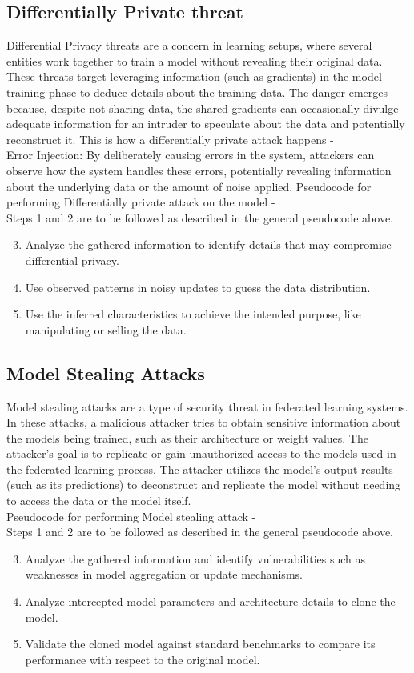 \documentclass[conference]{IEEEtran}
\begin{document}
\subsection{Differentially Private threat}
Differential Privacy threats are a concern in learning setups, where several entities work together to train a model without revealing their original data. These threats target leveraging information (such as gradients) in the model training phase to deduce details about the training data. The danger emerges because, despite not sharing data, the shared gradients can occasionally divulge adequate information for an intruder to speculate about the data and potentially reconstruct it. This is how a differentially private attack happens - \\
Error Injection: By deliberately causing errors in the system, attackers can observe how the system handles these errors, potentially revealing information about the underlying data or the amount of noise applied.
Pseudocode for performing Differentially private attack on the model - \\
Steps 1 and 2 are to be followed as described in the general pseudocode above.
\begin{enumerate}
  \setcounter{enumi}{2}
\item Analyze the gathered information to identify details that may compromise differential privacy.
\item Use observed patterns in noisy updates to guess the data distribution.
\item Use the inferred characteristics to achieve the intended purpose, like manipulating or selling the data.

\end{enumerate} 


\subsection{Model Stealing Attacks}
Model stealing attacks are a type of security threat in federated learning systems. In these attacks, a malicious attacker tries to obtain sensitive information about the models being trained, such as their architecture or weight values. The attacker's goal is to replicate or gain unauthorized access to the models used in the federated learning process. The attacker utilizes the model's output results (such as its predictions) to deconstruct and replicate the model without needing to access the data or the model itself.\\
Pseudocode for performing Model stealing attack -\\
Steps 1 and 2 are to be followed as described in the
general pseudocode above.
\begin{enumerate}
  \setcounter{enumi}{2}
\item Analyze the gathered information and identify vulnerabilities such as weaknesses in model aggregation or update mechanisms.
\item Analyze intercepted model parameters and architecture details to clone the model.
\item Validate the cloned model against standard benchmarks to compare its performance with respect to the original model.
\end{enumerate} 
\end{document}
